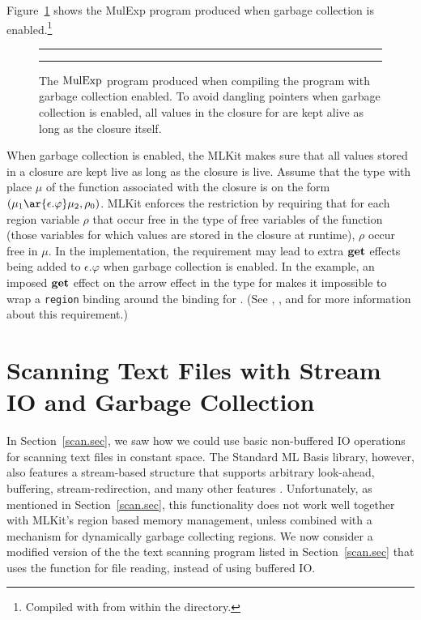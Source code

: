 \documentclass[12pt]{book}
\begin{document}
Figure~\ref{dangling_gc.fig} shows the MulExp program produced when garbage
collection is enabled.\footnote{Compiled with  from within the
 directory.}
\begin{figure}[ht]
\hrule \medskip
{}
\caption{The $\hbox{\rm MulExp}$ program produced when compiling the program
   with garbage collection enabled. To avoid dangling
  pointers when garbage collection is enabled, all values in the closure for
   are kept alive as long as the closure itself.}  \medskip \hrule
\label{dangling_gc.fig}
\end{figure}
When garbage collection is enabled, the MLKit makes sure that all values stored
in a closure are kept live as long as the closure is live.  Assume that the type
with place $\mu$ of the function associated with the closure is on the form
$(\mu_1 \ar{\epsilon.\varphi} \mu_2, \rho_0)$.  MLKit enforces the
restriction by requiring that for each region variable $\rho$ that occur free in
the type of free variables of the function (those variables for which values are
stored in the closure at runtime), $\rho$ occur free in $\mu$. In the
implementation, the requirement may lead to extra $\mathop{\bf get}\nolimits$ effects being added to
$\epsilon.\varphi$ when garbage collection is enabled. In the example, an
imposed $\mathop{\bf get}\nolimits$ effect on the arrow effect in the type for  makes it
impossible to wrap a {\tt region} binding around the binding for . (See
\cite[page 50]{total93}, \cite{elsman:tldi03}, and
\cite{gcsafety-revisited-tr-2022,10.1145/3591229} for more information about
this requirement.)

\section{Scanning Text Files with Stream IO and Garbage Collection}

In Section~\ref{scan.sec}, we saw how we could use basic non-buffered 
IO operations for scanning text files in constant space. The Standard ML Basis
library, however, also features a stream-based  structure that
supports arbitrary look-ahead, buffering, stream-redirection, and many other
features \cite{basislib2004}. Unfortunately, as mentioned in
Section~\ref{scan.sec}, this functionality does not work well together with
MLKit's region based memory management, unless combined with a mechanism for
dynamically garbage collecting regions. We now consider a modified version of
the the text scanning program listed in Section~\ref{scan.sec} that uses the
 function for file reading, instead of using 
buffered IO.
\end{document}
